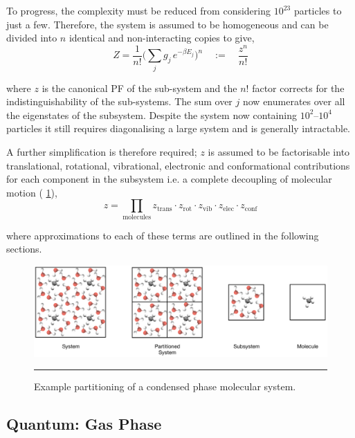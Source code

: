 \documentclass[../main.tex]{subfiles}
\begin{document}
To progress, the complexity must be reduced from considering $10^{23}$ particles to just a few. Therefore, the system is assumed to be homogeneous and can be divided into $n$ identical and non-interacting copies to give,
\begin{equation}
Z = \frac{1}{n!} {\Big (} \sum_j g_j \, e^{-\beta E_j} {\Big )}^n \quad := \quad \frac{z^n}{n!}
\label{Z_partion_q}
\end{equation}

where $z$ is the canonical PF of the sub-system and the $n!$ factor corrects for the indistinguishability of the sub-systems. The sum over $j$ now enumerates over all the eigenstates of the subsystem. Despite the system now containing $10^2$--$10^4$ particles it still requires diagonalising a large system and is generally intractable.

A further simplification is therefore required; $z$ is assumed to be factorisable into translational, rotational, vibrational, electronic and conformational contributions for each component in the subsystem i.e. a complete decoupling of molecular motion (\figurename{ \ref{fig::entropy_X1}}),
\begin{equation}
z = \prod_{\text{molecules}} z_\text{trans} \cdot z_\text{rot} \cdot z_\text{vib} \cdot z_\text{elec} \cdot z_\text{conf}
\label{equation::subsystem_pf}
\end{equation}

where approximations to each of these terms are outlined in the following sections.

\begin{figure}[h!]
	\centering
	\includegraphics[width=\textwidth]{4/figs/figX1/systems_methane_in_h2o.png}
	\vspace{0.2cm}
	\hrule
	\caption{Example partitioning of a condensed phase molecular system.}
	\label{fig::entropy_X1}
\end{figure}



\subsection{Quantum: Gas Phase}
\end{document}
